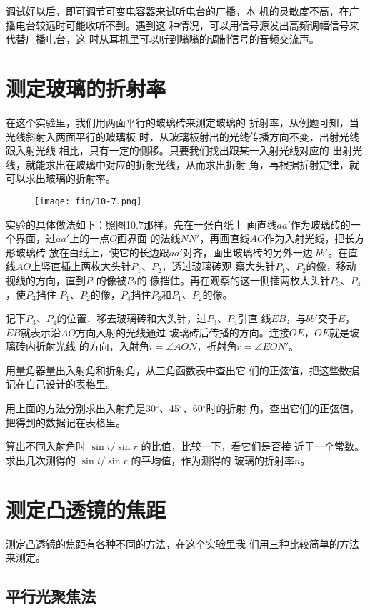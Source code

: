 调试好以后，即可调节可变电容器来试听电台的广播，本
机的灵敏度不高，在广播电台较远时可能收听不到。遇到这
种情况，可以用信号源发出高频调幅信号来代替广播电台，这
时从耳机里可以听到嗡嗡的调制信号的音频交流声。

\section{测定玻璃的折射率}

在这个实验里，我们用两面平行的玻璃砖来测定玻璃的
折射率，从例题可知，当光线斜射入两面平行的玻璃板
时，从玻璃板射出的光线传播方向不变，出射光线跟入射光线
相比，只有一定的侧移。只要我们找出跟某一入射光线对应的
出射光线，就能求出在玻璃中对应的折射光线，从而求出折射
角，再根据折射定律，就可以求出玻璃的折射率。
\begin{figure}[htp]\centering
    \texttt{[image: fig/10-7.png]}
    \caption{}
    \end{figure}

实验的具体做法如下：照图10.7那样，先在一张白纸上
画直线$aa'$作为玻璃砖的一个界面，过$aa'$上的一点$O$画界面
的法线$NN'$，再画直线$AO$作为入射光线，把长方形玻璃砖
放在白纸上，使它的长边跟$aa'$对齐，画出玻璃砖的另外一边
$bb'$。在直线$AO$上竖直插上两枚大头针$P_1$、$P_2$，透过玻璃砖观
察大头针$P_1$、$P_2$的像，移动视线的方向，直到$P_1$的像被$P_2$的
像挡住。再在观察的这一侧插两枚大头针$P_3$、$P_4$，使$P_3$挡住
$P_1$、$P_2$的像，$P_4$挡住$P_3$和$P_1$、$P_2$的像。


记下$P_3$、$P_4$的位置．移去玻璃砖和大头针，过$P_3$、$P_4$引直
线$EB$，与$bb'$交于$E$，$EB$就表示沿$AO$方向入射的光线通过
玻璃砖后传播的方向。连接$OE$，$OE$就是玻璃砖内折射光线
的方向，入射角$i=\angle AON$，折射角$r=\angle EON'$。

用量角器量出入射角和折射角，从三角函数表中查出它
们的正弦值，把这些数据记在自己设计的表格里。

用上面的方法分别求出入射角是30$^\circ$、45$^\circ$、60$^\circ$时的折射
角，查出它们的正弦值，把得到的数据记在表格里。

算出不同入射角时
$\sin i/\sin r$
的比值，比较一下，看它们是否接
近于一个常数。求出几次测得的
$\sin i/\sin r$
的平均值，作为测得的
玻璃的折射率$n$。

\section{测定凸透镜的焦距}
测定凸透镜的焦距有各种不同的方法，在这个实验里我
们用三种比较简单的方法来测定。

\subsection{平行光聚焦法}

